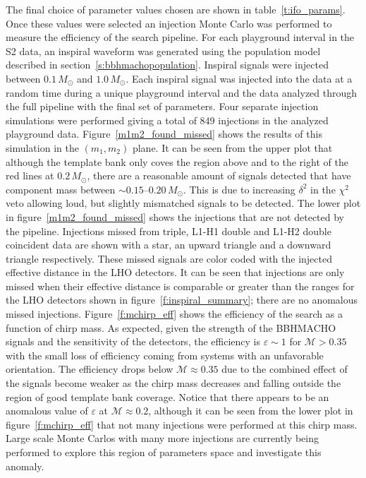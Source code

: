 The final choice of parameter values chosen are shown in
table~\ref{t:ifo_params}. Once these values were selected an injection Monte
Carlo was performed to measure the efficiency of the search pipeline. For each
playground interval in the S2 data, an inspiral waveform was generated using
the population model described in section~\ref{s:bbhmachopopulation}. Inspiral
signals were injected between $0.1\,M_\odot$ and $1.0\,M_\odot$. Each inspiral
signal was injected into the data at a random time during a unique playground
interval and the data analyzed through the full pipeline with the final set
of parameters. Four separate injection simulations were performed giving a
total of 849 injections in the analyzed playground data.
Figure~\ref{m1m2_found_missed} shows the results of this simulation in the
$(m_1,m_2)$ plane. It can be seen from the upper plot that although the
template bank only coves the region above and to the right of the red lines at
$0.2\,M_\odot$, there are a reasonable amount of signals detected that have
component mass between $\sim 0.15$--$0.20\,M_\odot$. This is due to increasing
$\delta^2$ in the $\chi^2$ veto allowing loud, but slightly mismatched signals
to be detected. The lower plot in figure~\ref{m1m2_found_missed} shows the
injections that are not detected by the pipeline. Injections missed from
triple, L1-H1 double and L1-H2 double coincident data are shown with a star,
an upward triangle and a downward triangle respectively. These missed signals
are color coded with the injected effective distance in the LHO detectors. It
can be seen that injections are only missed when their effective distance is
comparable or greater than the ranges for the LHO detectors shown in
figure~\ref{f:inspiral_summary}; there are no anomalous missed injections.
Figure~\ref{f:mchirp_eff} shows the efficiency of the search as a function of
chirp mass. As expected, given the strength of the BBHMACHO signals and the
sensitivity of the detectors, the efficiency is $\varepsilon \sim 1$ for
$\mathcal{M} >0.35$ with the small loss of efficiency coming from systems with
an unfavorable orientation. The efficiency drops below $\mathcal{M} \approx
0.35$ due to the combined effect of the signals become weaker as the chirp
mass decreases and falling outside the region of good template bank coverage.
Notice that there appears to be an anomalous value of $\varepsilon$ at
$\mathcal{M} \approx 0.2$, although it can be seen from the lower plot in
figure~\ref{f:mchirp_eff} that not many injections were performed at this
chirp mass. Large scale Monte Carlos with many more injections are currently
being performed to explore this region of parameters space and investigate
this anomaly.

